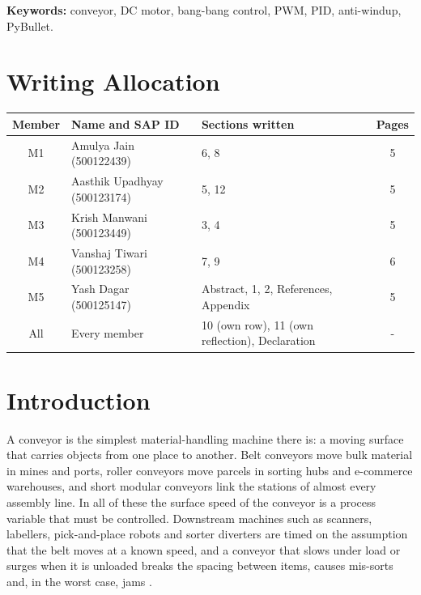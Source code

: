\documentclass[12pt,a4paper]{article}
\begin{document}
\textbf{Keywords:} conveyor, DC motor, bang-bang control, PWM, PID, anti-windup, PyBullet.
\clearpage

\tableofcontents
\clearpage

\listoffigures
{}
\vspace{1cm}
\listoftables
{}
\clearpage

\section*{Writing Allocation}
\begin{center}
\begin{tabular}{|c|l|p{6.2cm}|c|}
\hline
\textbf{Member} & \textbf{Name and SAP ID} & \textbf{Sections written} & \textbf{Pages} \\ \hline
M1 & Amulya Jain (500122439) & 6, 8 & 5 \\ \hline
M2 & Aasthik Upadhyay (500123174) & 5, 12 & 5 \\ \hline
M3 & Krish Manwani (500123449) & 3, 4 & 5 \\ \hline
M4 & Vanshaj Tiwari (500123258) & 7, 9 & 6 \\ \hline
M5 & Yash Dagar (500125147) & Abstract, 1, 2, References, Appendix & 5 \\ \hline
All & Every member & 10 (own row), 11 (own reflection), Declaration & - \\ \hline
\end{tabular}
\end{center}
\clearpage

\setcounter{page}{1}

\section{Introduction}

A conveyor is the simplest material-handling machine there is: a moving surface that carries objects from one place to another. Belt conveyors move bulk material in mines and ports, roller conveyors move parcels in sorting hubs and e-commerce warehouses, and short modular conveyors link the stations of almost every assembly line. In all of these the surface speed of the conveyor is a process variable that must be controlled. Downstream machines such as scanners, labellers, pick-and-place robots and sorter diverters are timed on the assumption that the belt moves at a known speed, and a conveyor that slows under load or surges when it is unloaded breaks the spacing between items, causes mis-sorts and, in the worst case, jams \cite{cema}.
\end{document}
